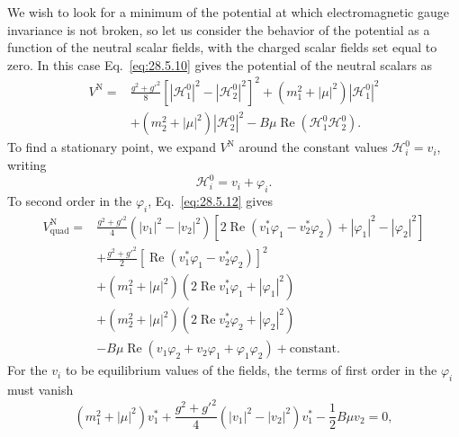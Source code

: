 We wish to look for a minimum of the potential at which electromagnetic
gauge invariance is not broken, so let us consider the behavior of the
potential as a function of the neutral scalar fields, with the charged
scalar fields set equal to zero. In this case Eq.~\eqref{eq:28.5.10}
gives the potential of the neutral scalars as
\begin{equation}
  \begin{aligned}
  V^{\mathrm N}
  ={}&\frac{g^2+g'^2}{8}
    \left[
      |\mathcal{H}_1^0|^2-|\mathcal{H}_2^0|^2
    \right]^2
    +(m_1^2+|\mu|^2)|\mathcal{H}_1^0|^2\\
  &+(m_2^2+|\mu|^2)|\mathcal{H}_2^0|^2
    -B\mu\operatorname{Re}
      \left(\mathcal{H}_1^0\mathcal{H}_2^0\right).
  \end{aligned}
  \tag{28.5.12}\label{eq:28.5.12}
\end{equation}
To find a stationary point, we expand \(V^{\mathrm N}\) around the constant
values \(\mathcal{H}_i^0=v_i\), writing
\begin{equation}
  \mathcal{H}_i^0=v_i+\varphi_i.
  \tag{28.5.13}\label{eq:28.5.13}
\end{equation}
To second order in the \(\varphi_i\), Eq.~\eqref{eq:28.5.12} gives
\begin{equation}
  \begin{aligned}
  V_{\mathrm{quad}}^{\mathrm N}
  ={}&
    \frac{g^2+g'^2}{4}(|v_1|^2-|v_2|^2)
    \left[
      2\operatorname{Re}(v_1^*\varphi_1-v_2^*\varphi_2)
      +|\varphi_1|^2-|\varphi_2|^2
    \right]\\
  &+\frac{g^2+g'^2}{2}
    \left[
      \operatorname{Re}(v_1^*\varphi_1-v_2^*\varphi_2)
    \right]^2\\
  &+(m_1^2+|\mu|^2)
    \left(2\operatorname{Re}v_1^*\varphi_1+|\varphi_1|^2\right)\\
  &+(m_2^2+|\mu|^2)
    \left(2\operatorname{Re}v_2^*\varphi_2+|\varphi_2|^2\right)\\
  &-B\mu\operatorname{Re}
    \left(v_1\varphi_2+v_2\varphi_1+\varphi_1\varphi_2\right)
    +\text{constant}.
  \end{aligned}
  \tag{28.5.14}\label{eq:28.5.14}
\end{equation}
For the \(v_i\) to be equilibrium values of the fields, the terms of first
order in the \(\varphi_i\) must vanish
\begin{equation}
  (m_1^2+|\mu|^2)v_1^*
  +\frac{g^2+g'^2}{4}(|v_1|^2-|v_2|^2)v_1^*
  -\frac12B\mu v_2=0,
  \tag{28.5.15}\label{eq:28.5.15}
\end{equation}
